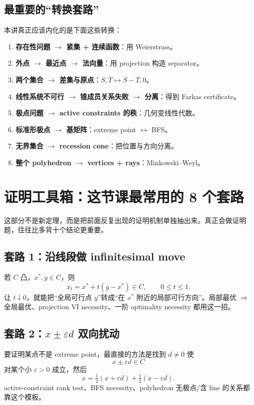 \documentclass[11pt,a4paper,openany]{ctexrep}
\theoremstyle{definition}
\newcommand{\eps}{\varepsilon}
\begin{document}
\section{最重要的“转换套路”}
本讲真正应该内化的是下面这些转换：
\begin{enumerate}[leftmargin=2.3em,label=\arabic*.]
  \item \textbf{存在性问题 $\to$ 紧集 + 连续函数}：用 Weierstrass。
  \item \textbf{外点 $\to$ 最近点 $\to$ 法向量}：用 projection 构造 separator。
  \item \textbf{两个集合 $\to$ 差集与原点}：$S,T\mapsto S-T,0$。
  \item \textbf{线性系统不可行 $\to$ 锥成员关系失败 $\to$ 分离}：得到 Farkas certificate。
  \item \textbf{极点问题 $\to$ active constraints 的秩}：几何变线性代数。
  \item \textbf{标准形极点 $\to$ 基矩阵}：extreme point $\leftrightarrow$ BFS。
  \item \textbf{无界集合 $\to$ recession cone}：把位置与方向分离。
  \item \textbf{整个 polyhedron $\to$ vertices + rays}：Minkowski--Weyl。
\end{enumerate}

\chapter{证明工具箱：这节课最常用的 8 个套路}

这部分不是新定理，而是把前面反复出现的证明机制单独抽出来。真正会做证明题，往往比多背十个结论更重要。

\section{套路 1：沿线段做 infinitesimal move}
若 $C$ 凸，$x^*,y\in C$，则
\[
x_t=x^*+t(y-x^*)\in C,\qquad 0\le t\le1.
\]
让 $t\downarrow0$，就能把“全局可行点 $y$”转成“在 $x^*$ 附近的局部可行方向”。局部最优 $\Rightarrow$ 全局最优、projection VI necessity、一阶 optimality necessity 都用这一招。

\section{套路 2：$x\pm\eps d$ 双向扰动}
要证明某点不是 extreme point，最直接的方法是找到 $d\ne0$ 使
\[
x\pm\eps d\in C
\]
对某个小 $\eps>0$ 成立，然后
\[
x=\tfrac12(x+\eps d)+\tfrac12(x-\eps d).
\]
active-constraint rank test、BFS necessity、polyhedron 无极点/含 line 的关系都靠这个模板。
\end{document}
